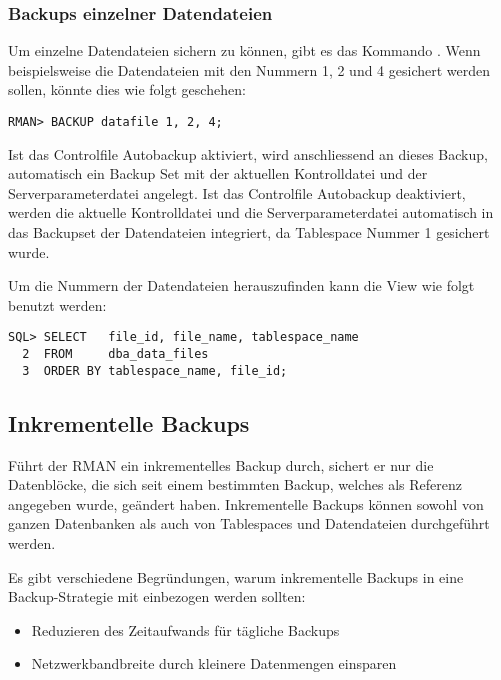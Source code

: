         \subsubsection{Backups einzelner Datendateien}
          Um einzelne Datendateien sichern zu können, gibt es das Kommando . Wenn beispielsweise die Datendateien mit den Nummern 1, 2 und 4 gesichert werden sollen, könnte dies wie folgt geschehen:
          \begin{lstlisting}[caption={Backup einzelner Datendateien},label=admin1311,language=rman]
RMAN> BACKUP datafile 1, 2, 4;
          \end{lstlisting}
          \begin{merke}
            Ist das Controlfile Autobackup aktiviert, wird anschliessend an dieses Backup, automatisch ein Backup Set mit der aktuellen Kontrolldatei und der Serverparameterdatei angelegt. Ist das Controlfile Autobackup deaktiviert, werden die aktuelle Kontrolldatei und die Serverparameterdatei automatisch in das Backupset der Datendateien integriert, da Tablespace Nummer 1 gesichert wurde.
          \end{merke}
          Um die Nummern der Datendateien herauszufinden kann die View  wie folgt benutzt werden:
          \begin{lstlisting}[caption={Herausfinden der Datendateinummern},label=admin1312,language=oracle_sql]
SQL> SELECT   file_id, file_name, tablespace_name
  2  FROM     dba_data_files
  3  ORDER BY tablespace_name, file_id;
          \end{lstlisting}
      \subsection{Inkrementelle Backups}
        Führt der RMAN ein inkrementelles Backup durch, sichert er nur die Datenblöcke, die sich seit einem bestimmten Backup, welches als Referenz angegeben wurde, geändert haben. Inkrementelle Backups können sowohl von ganzen Datenbanken als auch von Tablespaces und Datendateien durchgeführt werden.

        Es gibt verschiedene Begründungen, warum inkrementelle Backups in eine Backup-Stra\-te\-gie mit einbezogen werden sollten:
        \begin{itemize}
          \item Reduzieren des Zeitaufwands für tägliche Backups
          \item Netzwerkbandbreite durch kleinere Datenmengen einsparen
        \end{itemize}
